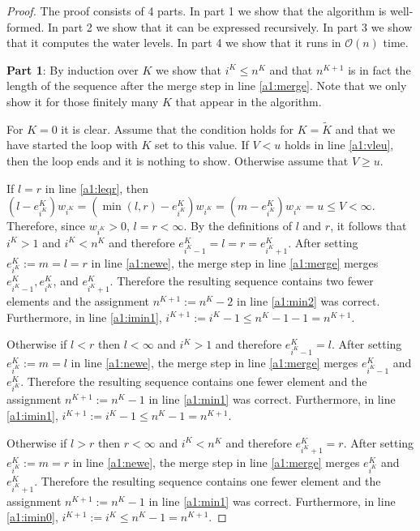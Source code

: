\documentclass[11pt,a4paper]{article}
\newcommand{\bO}{\mathcal{O}}
\begin{document}
\begin{proof}
The proof consists of 4 parts. In part 1 we show that the algorithm is well-formed.
In part 2 we show that it can be expressed recursively.
In part 3 we show that it computes the water levels.
In part 4 we show that it runs in $\bO(n)$ time.

\textbf{Part 1}: By induction over $K$ we show that $i^K \le n^K$ and that $n^{K+1}$ is in fact the length of the sequence after the merge step in line \ref{a1:merge}.
Note that we only show it for those finitely many $K$ that appear in the algorithm.

For $K=0$ it is clear.
Assume that the condition holds for $K = \tilde{K}$ and that we have started the loop with $K$ set to this value.
If $V < u$ holds in line \ref{a1:vleu}, then the loop ends and it is nothing to show.
Otherwise assume that $V \ge u$.

If $l = r$ in line \ref{a1:leqr}, then $(l - e_{i^K}^K)w_{i^K} = (\min(l,r) - e_{i^K}^K)w_{i^K} = (m - e_{i^K}^K)w_{i^K} = u \le V < \infty$.
Therefore, since $w_{i^K} > 0$, $l = r < \infty$.
By the definitions of $l$ and $r$, it follows that $i^K > 1$ and $i^K < n^K$ and therefore
$e_{i^K-1}^K = l = r = e_{i^K+1}^K$.
After setting $e_{i^K}^K := m = l = r$ in line \ref{a1:newe}, the merge step in line \ref{a1:merge} merges $e_{i^K - 1}^K, e_{i^K}^K$, and $e_{i^K + 1}^K$.
Therefore the resulting sequence contains two fewer elements and the assignment $n^{K+1} := n^K - 2$ in line \ref{a1:min2} was correct.
Furthermore, in line \ref{a1:imin1}, $i^{K+1} := i^K - 1 \le n^K - 1 - 1 = n^{K+1}$.

Otherwise if $l < r$ then $l < \infty$ and $i^K > 1$ and therefore $e_{i^K-1}^K = l$.
After setting $e_{i^K}^K := m = l$ in line \ref{a1:newe}, the merge step in line \ref{a1:merge} merges $e_{i^K - 1}^K$ and $e_{i^K}^K$.
Therefore the resulting sequence contains one fewer element and the assignment $n^{K+1} := n^K - 1$ in line \ref{a1:min1} was correct.
Furthermore, in line \ref{a1:imin1}, $i^{K+1} := i^K - 1 \le n^K - 1 = n^{K+1}$.

Otherwise if $l > r$ then $r < \infty$ and $i^K < n^K$ and therefore $e_{i^K+1}^K = r$.
After setting $e_{i^K}^K := m = r$ in line \ref{a1:newe}, the merge step in line \ref{a1:merge} merges $e_{i^K}^K$ and $e_{i^K + 1}^K$.
Therefore the resulting sequence contains one fewer element and the assignment $n^{K+1} := n^K - 1$ in line \ref{a1:min1} was correct.
Furthermore, in line \ref{a1:imin0}, $i^{K+1} := i^K \le n^K - 1 = n^{K+1}$.


\end{proof}
\end{document}
